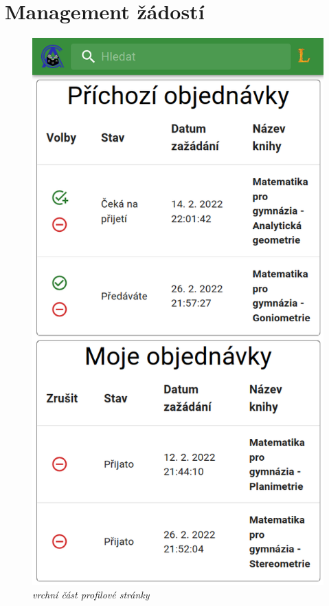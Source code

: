 \documentclass[a4paper,oneside,12pt]{report}
\begin{document}
\section{Management žádostí}
\begin{figure}
	\vspace{-17mm}
	\centering
	\includegraphics{../img/Requests.png}
	\vspace{-8mm}
	\caption{\textit{vrchní část profilové stránky}}\label{fig:requests}
\end{figure}
\end{document}
